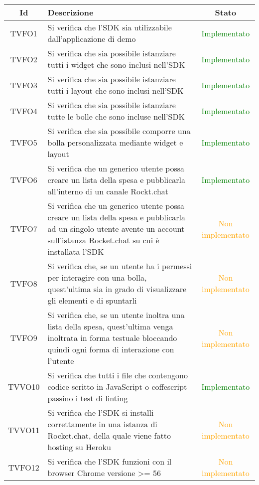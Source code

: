 \begin{center}
	\begin{longtable}{|c|>{\centering}m{10cm}|c|}\hline
		Id & Descrizione & Stato\\ \hline
		TVFO1 & Si verifica che l'SDK sia utilizzabile dall'applicazione di demo & \textcolor{Green}{Implementato}\\ \hline
		TVFO2 & Si verifica che sia possibile istanziare tutti i widget che sono inclusi nell'SDK & \textcolor{Green}{Implementato}\\ \hline
		TVFO3 & Si verifica che sia possibile istanziare tutti i layout che sono inclusi nell'SDK & \textcolor{Green}{Implementato}\\ \hline
		TVFO4 & Si verifica che sia possibile istanziare tutte le bolle che sono incluse nell'SDK & \textcolor{Green}{Implementato}\\ \hline
		TVFO5 & Si verifica che sia possibile comporre una bolla personalizzata mediante widget e layout & \textcolor{Green}{Implementato}\\ \hline
		TVFO6 & Si verifica che un generico utente possa creare un lista della spesa e pubblicarla all'interno di un canale Rockt.chat & \textcolor{Green}{Implementato}\\ \hline
		TVFO7 & Si verifica che un generico utente possa creare un lista della spesa e pubblicarla ad un singolo utente avente un account sull'istanza Rocket.chat su cui è installata l'SDK & \textcolor{Orange}{Non implementato}\\ \hline
		TVFO8 & Si verifica che, se un utente ha i permessi per interagire con una bolla, quest'ultima sia in grado di visualizzare gli elementi e di spuntarli & \textcolor{Orange}{Non implementato}\\ \hline
		TVFO9 & Si verifica che, se un utente inoltra una lista della spesa, quest'ultima venga inoltrata in forma testuale bloccando quindi ogni forma di interazione con l'utente & \textcolor{Orange}{Non implementato}\\ \hline
		TVVO10 & Si verifica che tutti i file che contengono codice scritto in JavaScript o coffescript passino i test di linting & \textcolor{Green}{Implementato}\\ \hline
		TVVO11 & Si verifica che l'SDK si installi correttamente in una istanza di Rocket.chat, della quale viene fatto hosting su Heroku & \textcolor{Orange}{Non implementato}\\ \hline
		TVFO12 & Si verifica che l'SDK funzioni con il browser Chrome versione >= 56 & \textcolor{Orange}{Non implementato}\\ \hline

\end{longtable}
\end{center}
